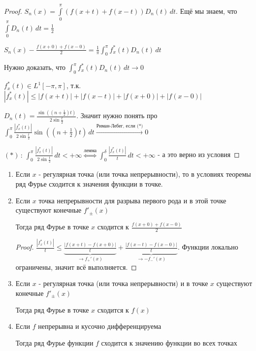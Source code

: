 \begin{proof}
    $S_n (x) = \int\limits_0^\pi (f(x + t) + f(x - t)) D_n (t) \, dt$. Ещё мы знаем, что $\int\limits_0^\pi D_n (t) \, dt = \frac{1}{2}$

    $S_n(x) - \frac{f(x + 0) + f(x - 0)}{2} = \frac{1}{\pi} \int_0^\pi f_x^* (t) D_n (t) \, dt $

    Нужно доказать, что $\int_0^\pi f_x^* (t) D_n (t) \, dt \rightarrow 0$

    $f_x^* (t) \in L^1 [-\pi, \pi]$, т.к. $|f_x^* (t)| \leqslant |f(x + t)| + |f(x - t)| + |f(x + 0)| + |f(x - 0)|$

    $D_n(t) = \frac{\sin ((n + \frac{1}{2})t)}{2\sin \frac{t}{2}}$. Значит нужно понять про $\int_0^\pi \frac{|f_x^* (t)|}{2 \sin \frac{t}{2}} \sin ((n + \frac{1}{2})t) \, dt \overset{\text{Риман-Лебег, если (*)}}{\rightarrow} 0$

    $(*) \, : \, \int_0^\pi \frac{|f_x^* (t)|}{2 \sin \frac{t}{2}} \, dt < +\infty \overset{\text{лемма}}{\Longleftrightarrow} \int_0^\delta \frac{|f_x^* (t)|}{t} \, dt < +\infty$ - а это верно из условия 
\end{proof}

\begin{consequence}
    \begin{enumerate}
        \item {
            Если $x$ - регулярная точка (или точка непрерывности), то в условиях теоремы ряд Фурье сходится к значения функции в точке.
        }
        \item {
            Если $x$ точка непрерывности для разрыва первого рода и в этой точке существуют конечные $f'_{\pm} (x)$

            Тогда ряд Фурье в точке $x$ сходится к $\frac{f(x + 0) + f(x - 0)}{2}$ 

            \begin{proof}
                $\frac{|f_x^* (t)|}{t} \leqslant \underbrace{\frac{|f(x + t) - f(x + 0)|}{t}}_{\rightarrow f_+'(x)} + \underbrace{\frac{|f(x - t) - f(x - 0)|}{t}}_{\rightarrow -f_-' (x)}$. Функции локально ограничены, значит всё выполняется.
            \end{proof}
        }
        \item {
            Если $x$ - регулярная точка (или точка непрерывности) и в точке $x$ существуют конечные $f'_{\pm} (x)$

            Тогда ряд Фурье в точке $x$ сходится к $f(x)$
        }
        \item {
            Если $f$ непрерывна и кусочно дифференцируема

            Тогда ряд Фурье функции $f$ сходится к значению функции во всех точках
        }
    \end{enumerate}
\end{consequence}

